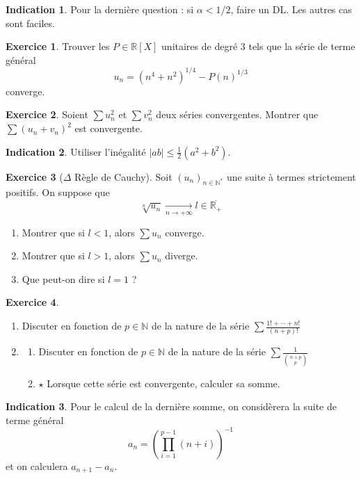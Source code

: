 \documentclass[french]{book}
\newcommand{\N}{\mathbb{N}}
\newcommand{\R}{\mathbb{R}}
\newcommand{\st}{^*}
\newcommand{\inv}{^{-1}}
\theoremstyle{definition}
\newtheorem{ex}{Exercice}[chapter]
\theoremstyle{theorem}
\newtheorem*{ind}{Indication}
\theoremstyle{remark}
\begin{document}
\begin{ind}
	Pour la dernière question : si $\alpha<1/2$, faire un DL. Les autres cas sont faciles.
\end{ind}

\begin{ex}
	Trouver les $P\in\R[X]$ unitaires de degré $3$ tels que la série de terme général $$u_n=(n^4+n^2)^{1/4}-P(n)^{1/3}$$ converge.
\end{ex}

\begin{ex}
	Soient $\sum u_n^2$ et $\sum v_n^2$ deux séries convergentes. Montrer que $\sum(u_n+v_n)^2$ est convergente. 
\end{ex}

\begin{ind}
	Utiliser l'inégalité $\lvert ab\rvert\leqslant \displaystyle\frac{1}{2}(a^2+b^2)$.
\end{ind}

\begin{ex}[$\Delta$ Règle de Cauchy]
	Soit $(u_n)_{n\in\N\st}$ une suite à termes strictement positifs. On suppose que $$\sqrt[n]{u_n}\xrightarrow[n\to+\infty]{}l\in\overline{\R_+}$$
	\begin{enumerate}
		\item Montrer que si $l<1$, alors $\sum u_n$ converge.
		\item Montrer que si $l>1$, alors $\sum u_n$ diverge.
		\item Que peut-on dire si $l=1$ ?
	\end{enumerate}
\end{ex}

\begin{ex}
	\begin{enumerate}
		\item Discuter en fonction de $p\in\N$ de la nature de la série $\displaystyle\sum\frac{1!+\cdots+n!}{(n+p)!}$
		\item \begin{enumerate}[label=\alph*.]
			\item Discuter en fonction de $p\in\N$ de la nature de la série $\displaystyle\sum\frac{1}{\binom{n+p}{p}}$
			\item $\star$ Lorsque cette série est convergente, calculer sa somme.
		\end{enumerate}
	\end{enumerate}
\end{ex}

\begin{ind}
	Pour le calcul de la dernière somme, on considèrera la suite de terme général $$a_n=\left(\prod_{i=1}^{p-1}(n+i)\right)\inv$$ et on calculera $a_{n+1}-a_n$.
\end{ind}
\end{document}
